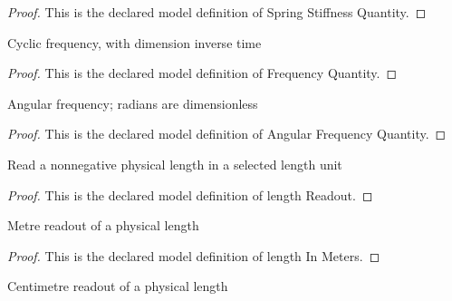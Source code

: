 \begin{proof}
  This is the declared model definition of Spring Stiffness Quantity.
\end{proof}
\begin{definition}
  \label{def:physics:phyx-mini-0281:phyxminiproblems-problemphyxmini0281-frequencyquantity}
  Cyclic frequency, with dimension inverse time
\end{definition}
\begin{proof}
  This is the declared model definition of Frequency Quantity.
\end{proof}
\begin{definition}
  \label{def:physics:phyx-mini-0281:phyxminiproblems-problemphyxmini0281-angularfrequencyquantity}
  Angular frequency; radians are dimensionless
\end{definition}
\begin{proof}
  This is the declared model definition of Angular Frequency Quantity.
\end{proof}
\begin{definition}
  \label{def:physics:phyx-mini-0281:phyxminiproblems-problemphyxmini0281-lengthreadout}
  Read a nonnegative physical length in a selected length unit
\end{definition}
\begin{proof}
  This is the declared model definition of length Readout.
\end{proof}
\begin{definition}
  \label{def:physics:phyx-mini-0281:phyxminiproblems-problemphyxmini0281-lengthinmeters}
  Metre readout of a physical length
\end{definition}
\begin{proof}
  This is the declared model definition of length In Meters.
\end{proof}
\begin{definition}
  \label{def:physics:phyx-mini-0281:phyxminiproblems-problemphyxmini0281-lengthincentimeters}
  Centimetre readout of a physical length
\end{definition}
